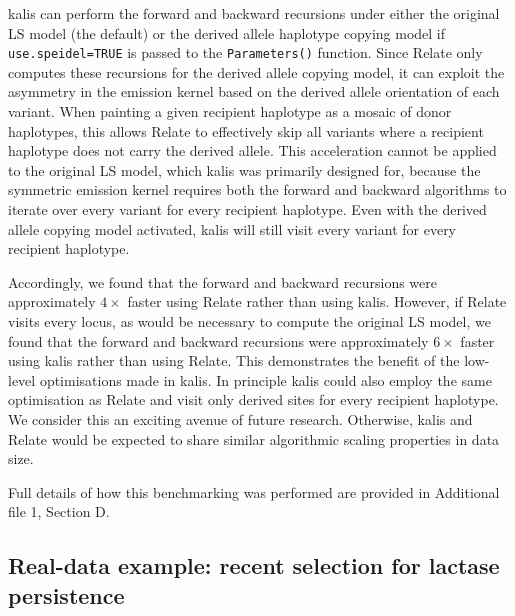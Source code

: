 \documentclass[pdflatex,referee,lineno,sn-nature]{sn-jnl}%
\newcommand{\pkg}[1]{{\fontseries{m}\fontseries{b}\selectfont #1}}
\begin{document}
\pkg{kalis} can perform the forward and backward recursions under either the original LS model (the default) or the derived allele haplotype copying model if \texttt{use.speidel=TRUE} is passed to the \texttt{Parameters()} function.
Since Relate only computes these recursions for the derived allele copying model, it can exploit the asymmetry in the emission kernel based on the derived allele orientation of each variant.
When painting a given recipient haplotype as a mosaic of donor haplotypes, this allows Relate to effectively skip all variants where a recipient haplotype does not carry the derived allele.
This acceleration cannot be applied to the original LS model, which \pkg{kalis} was primarily designed for, because the symmetric emission kernel requires both the forward and backward algorithms to iterate over every variant for every recipient haplotype.
Even with the derived allele copying model activated, \pkg{kalis} will still visit every variant for every recipient haplotype.

Accordingly, we found that the forward and backward recursions were approximately $4\times$ faster using Relate rather than using \pkg{kalis}.
However, if Relate visits every locus, as would be necessary to compute the original LS model, we found that the forward and backward recursions were approximately $6\times$ faster using \pkg{kalis} rather than using Relate.
This demonstrates the benefit of the low-level optimisations made in \pkg{kalis}.
In principle \pkg{kalis} could also employ the same optimisation as Relate and visit only derived sites for every recipient haplotype.
We consider this an exciting avenue of future research.
Otherwise, \pkg{kalis} and Relate would be expected to share similar algorithmic scaling properties in data size.

Full details of how this benchmarking was performed are provided in Additional file 1, Section D.


\subsection*{Real-data example: recent selection for lactase persistence}
\label{sec:realdata}
\end{document}
